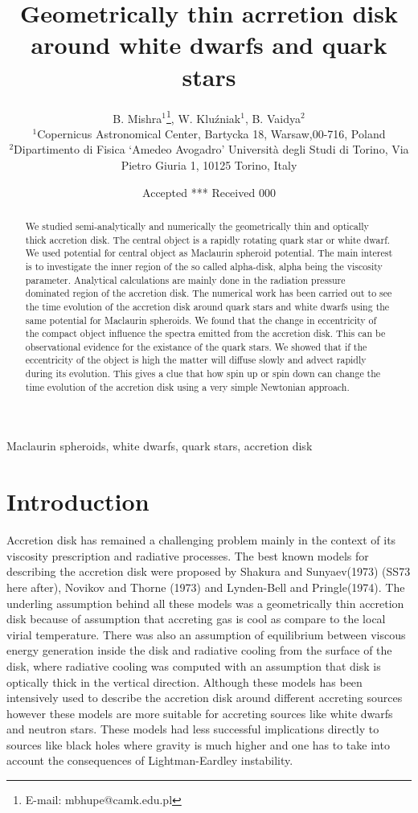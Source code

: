 \documentclass[useAMS,usenatbib]{mn2e}
\title[Geometrically thin acrretion disk around white dwarfs and quark stars]{Geometrically thin acrretion disk around white dwarfs and quark stars}
\author[B. Mishra, W. Klu\'zniak and B. Vaidya]{B. Mishra$^{1}$\thanks{E-mail:
mbhupe@camk.edu.pl}, W. Klu\'zniak$^{1}$, B. Vaidya$^{2}$\\
$^{1}$Copernicus Astronomical Center, Bartycka 18, Warsaw,00-716, Poland\\
$^{2}$Dipartimento di Fisica `Amedeo Avogadro' Università degli Studi di Torino, Via Pietro Giuria 1, 10125 Torino, Italy}
\begin{document}
\date{Accepted *** Received 000}
\pagerange{\pageref{firstpage}--\pageref{lastpage}} 
\maketitle
\label{firstpage}
\begin{abstract}
We studied semi-analytically and numerically the geometrically thin and optically thick accretion disk. The central object is a rapidly rotating quark star or white dwarf. We used potential for central object as Maclaurin spheroid potential. The main interest is to investigate the inner region of the so called alpha-disk, alpha being the viscosity parameter. Analytical calculations are mainly done in the radiation pressure dominated region of the accretion disk. The numerical work has been carried out to see the time evolution of the accretion disk around quark stars and white dwarfs using the same potential for Maclaurin spheroids. We found that the change in eccentricity of the compact object influence the spectra emitted from the accretion disk. This can be observational evidence for the existance of the quark stars. We showed that if the eccentricity of the object is high the matter will diffuse slowly and advect rapidly during its evolution. This gives a clue that how spin up or spin down can change the time evolution of the accretion disk using a very simple Newtonian approach.  
\end{abstract}
\begin{keywords}
Maclaurin spheroids, white dwarfs, quark stars, accretion disk
\end{keywords}
\section{Introduction}
Accretion disk has remained a challenging problem mainly in the context of its viscosity prescription and radiative processes. The best known models for describing the accretion disk were proposed by Shakura and Sunyaev(1973) (SS73 here after), Novikov and Thorne (1973) and Lynden-Bell and Pringle(1974). The underling assumption behind all these models was a geometrically thin accretion disk because of assumption that accreting gas is cool as compare to the local virial temperature. There was also an assumption of equilibrium between viscous energy generation inside the disk and radiative cooling from the surface of the disk, where radiative cooling was computed with an assumption that disk is optically thick in the vertical direction. Although these models has been intensively used to describe the accretion disk around different accreting sources however these models are more suitable for accreting sources like white dwarfs and neutron stars. These models had less successful implications directly to sources like black holes where gravity is much higher and one has to take into account the consequences of Lightman-Eardley instability. 
\end{document}
